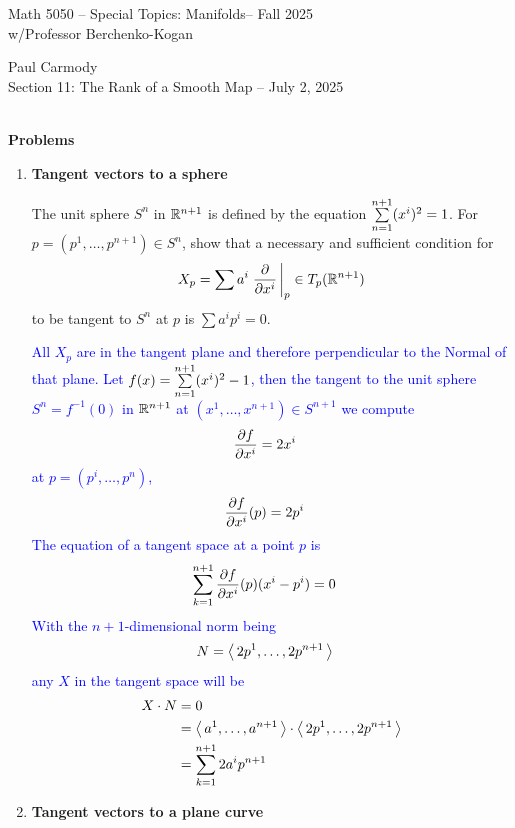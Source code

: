 \documentclass[12pt,a4paper]{report}
\newcommand{\CLASSNAME}{Math 5050 -- Special Topics: Manifolds}
\newcommand{\STUDENTNAME}{Paul Carmody}
\newcommand{\ASSIGNMENT}{Section 11: The Rank of a Smooth Map }
\newcommand{\DUEDATE}{July 2, 2025}
\newcommand{\PROFESSOR}{Professor Berchenko-Kogan}
\newcommand{\SEMESTER}{Fall 2025}
\newcommand{\BLUE}[1]{\textcolor{blue}{#1}}
\begin{document}
\begin{center}
	\Large{\CLASSNAME -- \SEMESTER} \\
	\large{ w/\PROFESSOR}
\end{center}
\begin{center}
	\STUDENTNAME \\
	\ASSIGNMENT -- \DUEDATE\\
\end{center} 


\noindent \textbf{\\\large{Problems}}

\begin{enumerate}[label=11.\arabic*.]
\item \textbf{Tangent vectors to a sphere}

The unit sphere $S^n$ in $\mathbb{R}^{n+1}$ is defined by the equation $\underset{n=1}{\overset{n+1}{\sum}} (x^i)^2=1$.  For $p=(p^1,\dots,p^{n+1}) \in S^n$, show that a necessary and sufficient condition for 
\begin{align*}
	X_p=\sum a^i\left . \frac{\partial }{\partial x^i} \, \right |_p \in T_p(\mathbb{R}^{n+1})
\end{align*}to be tangent to $S^n$ at $p$ is $\sum a^ip^i=0$.

\BLUE{All $X_p$ are in the tangent plane and therefore perpendicular to the Normal of that plane.  Let $f(x) = \underset{n=1}{\overset{n+1}{\sum}} (x^i)^2-1$, then the tangent to the unit sphere $S^n = f^{-1}(0)$ in $\mathbb{R}^{n+1}$ at $(x^1,\dots,x^{n+1}) \in S^{n+1}$ we compute 
\begin{align*}
	\frac{\partial f}{\partial x^i} &= 2x^i
\end{align*}at $p=(p^i,\dots, p^n)$,
\begin{align*}
	\frac{\partial f}{\partial x^i}(p) &= 2p^i
\end{align*}The equation of a tangent space at a point $p$ is 
\begin{align*}
	\sum_{k=1}^{n+1} \frac{\partial f}{\partial x^i}(p)(x^i-p^i)&=0 
\end{align*}With the $n+1$-dimensional norm being 
\begin{align*}
	N &= \left \langle\, 2p^1, \dots, 2p^{n+1} \,\right \rangle
\end{align*}any $X$ in the tangent space will be 
\begin{align*}
	X \cdot N &= 0 \\
	 &= \left \langle\, a^1,\dots, a^{n+1} \,\right \rangle\cdot\left \langle\, 2p^1, \dots, 2p^{n+1} \,\right \rangle \\
	 &= \sum_{k=1}^{n+1} 2a^ip^{n+1}
\end{align*}
}

\newpage
\item \textbf{Tangent vectors to a plane curve}


\end{enumerate}
\end{document}
